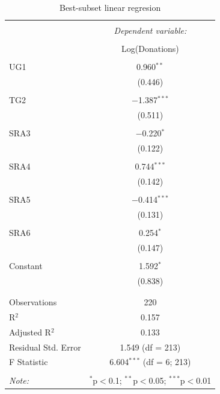 \documentclass[12pt]{article}
\begin{document}
\begin{table}[!htbp] \centering 
  \caption{Best-subset linear regresion} 
  \label{} 
\begin{tabular}{@{\extracolsep{5pt}}lc} 
\\[-1.8ex]\hline 
\hline \\[-1.8ex] 
 & \multicolumn{1}{c}{\textit{Dependent variable:}} \\ 
\cline{2-2} 
\\[-1.8ex] & Log(Donations) \\ 
\hline \\[-1.8ex] 
 UG1 & 0.960$^{**}$ \\ 
  & (0.446) \\ 
  & \\ 
 TG2 & $-$1.387$^{***}$ \\ 
  & (0.511) \\ 
  & \\ 
 SRA3 & $-$0.220$^{*}$ \\ 
  & (0.122) \\ 
  & \\ 
 SRA4 & 0.744$^{***}$ \\ 
  & (0.142) \\ 
  & \\ 
 SRA5 & $-$0.414$^{***}$ \\ 
  & (0.131) \\ 
  & \\ 
 SRA6 & 0.254$^{*}$ \\ 
  & (0.147) \\ 
  & \\ 
 Constant & 1.592$^{*}$ \\ 
  & (0.838) \\ 
  & \\ 
\hline \\[-1.8ex] 
Observations & 220 \\ 
R$^{2}$ & 0.157 \\ 
Adjusted R$^{2}$ & 0.133 \\ 
Residual Std. Error & 1.549 (df = 213) \\ 
F Statistic & 6.604$^{***}$ (df = 6; 213) \\ 
\hline 
\hline \\[-1.8ex] 
\textit{Note:}  & \multicolumn{1}{r}{$^{*}$p$<$0.1; $^{**}$p$<$0.05; $^{***}$p$<$0.01} \\ 
\end{tabular} 
\end{table} 
\end{document}
